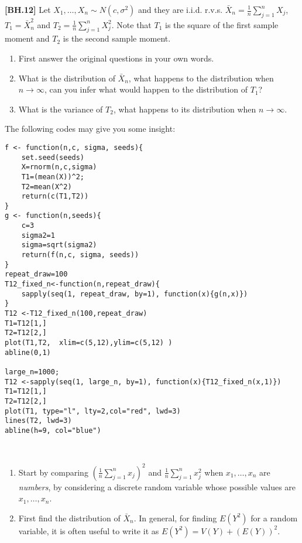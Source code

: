 \begin{exercise}
	\textbf{[BH.12]} Let $X_1, \ldots, X_n \sim N(c, \sigma^2)$ and they are i.i.d. r.v.s.  $\bar{X}_n = \frac{1}{n} \sum_{j = 1}^n X_j$, $T_1 = \bar{X}_n^2$ and $T_2 = \frac{1}{n} \sum_{j = 1}^n X_j^2$. Note that $T_1$ is the square of the first sample moment and $T_2$ is the second sample moment.
	\begin{enumerate}
\item First answer the original questions in your own words.
\item What is the distribution of $\bar{X}_n$, what happens to the distribution when $n\rightarrow \infty$, can you infer what would happen to the distribution of $T_1$?
\item What is the variance of $T_2$, what happens to its distribution when  $n\rightarrow \infty$.
	\end{enumerate}
	The following codes may give you some insight:
	\begin{verbatim}
f <- function(n,c, sigma, seeds){
	set.seed(seeds)
	X=rnorm(n,c,sigma)
	T1=(mean(X))^2;
	T2=mean(X^2)
	return(c(T1,T2))
} 
g <- function(n,seeds){
	c=3
	sigma2=1
	sigma=sqrt(sigma2)
	return(f(n,c, sigma, seeds))
}
repeat_draw=100
T12_fixed_n<-function(n,repeat_draw){
	sapply(seq(1, repeat_draw, by=1), function(x){g(n,x)})
}
T12 <-T12_fixed_n(100,repeat_draw)
T1=T12[1,] 
T2=T12[2,]
plot(T1,T2,  xlim=c(5,12),ylim=c(5,12) )
abline(0,1)

large_n=1000;
T12 <-sapply(seq(1, large_n, by=1), function(x){T12_fixed_n(x,1)})
T1=T12[1,] 
T2=T12[2,]
plot(T1, type="l", lty=2,col="red", lwd=3)
lines(T2, lwd=3)
abline(h=9, col="blue")
	\end{verbatim}
	\begin{hint}~
\begin{enumerate}
	\item Start by comparing $\left(\frac{1}{n} \sum_{j = 1}^n x_j\right)^2$ and $\frac{1}{n} \sum_{j = 1}^n x_j^2$ when $x_1, \ldots, x_n$ are \emph{numbers}, by considering a discrete random variable whose possible values are $x_1, \ldots, x_n$.
	\item First find the distribution of $\bar{X}_n$. In general, for finding $E(Y^2)$ for a random variable, it is often useful to write it as $E(Y^2) = V(Y) + (E(Y))^2$.
\end{enumerate}
	\end{hint}
\end{exercise} 